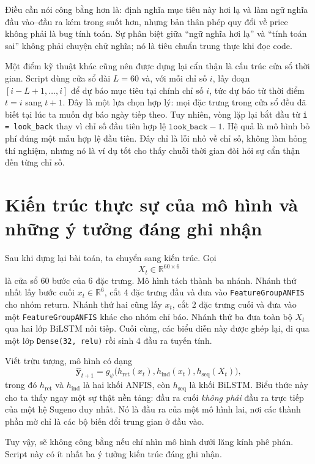 Điều cần nói công bằng hơn là: định nghĩa mục tiêu này hơi lạ và làm ngữ nghĩa đầu vào--đầu ra kém trong suốt hơn, nhưng bản thân phép quy đổi về price không phải là bug tính toán. Sự phân biệt giữa ``ngữ nghĩa hơi lạ'' và ``tính toán sai'' không phải chuyện chữ nghĩa; nó là tiêu chuẩn trung thực khi đọc code.

Một điểm kỹ thuật khác cũng nên được dựng lại cẩn thận là cấu trúc cửa sổ thời gian. Script dùng cửa sổ dài \(L=60\) và, với mỗi chỉ số \(i\), lấy đoạn \([i-L+1,\dots,i]\) để dự báo mục tiêu tại chính chỉ số \(i\), tức dự báo từ thời điểm \(t=i\) sang \(t+1\). Đây là một lựa chọn hợp lý: mọi đặc trưng trong cửa sổ đều đã biết tại lúc ta muốn dự báo ngày tiếp theo. Tuy nhiên, vòng lặp lại bắt đầu từ \texttt{i = look\_back} thay vì chỉ số đầu tiên hợp lệ \(\texttt{look\_back}-1\). Hệ quả là mô hình bỏ phí đúng một mẫu hợp lệ đầu tiên. Đây chỉ là lỗi nhỏ về chỉ số, không làm hỏng thí nghiệm, nhưng nó là ví dụ tốt cho thấy chuỗi thời gian đòi hỏi sự cẩn thận đến từng chỉ số.

\section{Kiến trúc thực sự của mô hình và những ý tưởng đáng ghi nhận}

Sau khi dựng lại bài toán, ta chuyển sang kiến trúc. Gọi
\[
X_t\in\mathbb{R}^{60\times 6}
\]
là cửa sổ 60 bước của 6 đặc trưng. Mô hình tách thành ba nhánh. Nhánh thứ nhất lấy bước cuối \(x_t\in\mathbb{R}^6\), cắt 4 đặc trưng đầu và đưa vào \texttt{FeatureGroupANFIS} cho nhóm return. Nhánh thứ hai cũng lấy \(x_t\), cắt 2 đặc trưng cuối và đưa vào một \texttt{FeatureGroupANFIS} khác cho nhóm chỉ báo. Nhánh thứ ba đưa toàn bộ \(X_t\) qua hai lớp BiLSTM nối tiếp. Cuối cùng, các biểu diễn này được ghép lại, đi qua một lớp \texttt{Dense(32, relu)} rồi sinh 4 đầu ra tuyến tính.

Viết trừu tượng, mô hình có dạng
\[
\widehat{\mathbf y}_{t+1}
=
g_\psi\bigl(
h_{\mathrm{ret}}(x_t),
h_{\mathrm{ind}}(x_t),
h_{\mathrm{seq}}(X_t)
\bigr),
\]
trong đó \(h_{\mathrm{ret}}\) và \(h_{\mathrm{ind}}\) là hai khối ANFIS, còn \(h_{\mathrm{seq}}\) là khối BiLSTM. Biểu thức này cho ta thấy ngay một sự thật nền tảng: đầu ra cuối \emph{không phải} đầu ra trực tiếp của một hệ Sugeno duy nhất. Nó là đầu ra của một mô hình lai, nơi các thành phần mờ chỉ là các bộ biến đổi trung gian ở đầu vào.

Tuy vậy, sẽ không công bằng nếu chỉ nhìn mô hình dưới lăng kính phê phán. Script này có ít nhất ba ý tưởng kiến trúc đáng ghi nhận.

